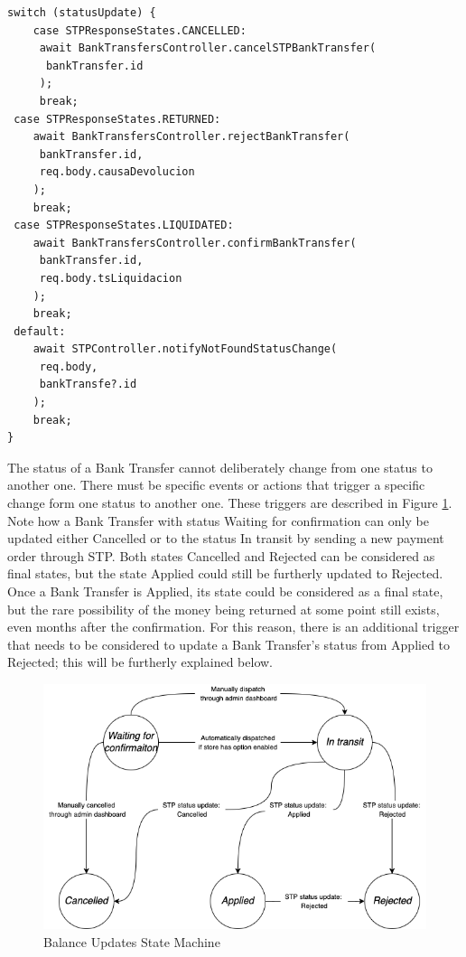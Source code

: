 \begin{verbatim}
switch (statusUpdate) {
    case STPResponseStates.CANCELLED:
     await BankTransfersController.cancelSTPBankTransfer(
      bankTransfer.id
     );
     break;
 case STPResponseStates.RETURNED:
    await BankTransfersController.rejectBankTransfer(
     bankTransfer.id,
     req.body.causaDevolucion
    );
    break;
 case STPResponseStates.LIQUIDATED:
    await BankTransfersController.confirmBankTransfer(
     bankTransfer.id,
     req.body.tsLiquidacion
    );
    break;
 default:
    await STPController.notifyNotFoundStatusChange(
     req.body,
     bankTransfe?.id
    );
    break;
}

\end{verbatim}

The status of a Bank Transfer cannot deliberately change from one status to another one. There must be specific events or actions that trigger a specific change form one status to another one. These triggers are described in Figure \ref{fig:state_machine_bank_transfers}. Note how a Bank Transfer with status Waiting for confirmation can only be updated either Cancelled or to the status In transit by sending a new payment order through STP. Both states Cancelled and Rejected can be considered as final states, but the state Applied could still be furtherly updated to Rejected. Once a Bank Transfer is Applied, its state could be considered as a final state, but the rare possibility of the money being returned at some point still exists, even months after the confirmation. For this reason, there is an additional trigger that needs to be considered to update a Bank Transfer’s status from Applied to Rejected; this will be furtherly explained below.

\begin{figure}[H]
    \centering
    \includegraphics[scale = 0.5]{assets/diagrams/BankTransfersStateMachine.png}
    \caption{Balance Updates State Machine}\label{fig:state_machine_bank_transfers}
\end{figure}

